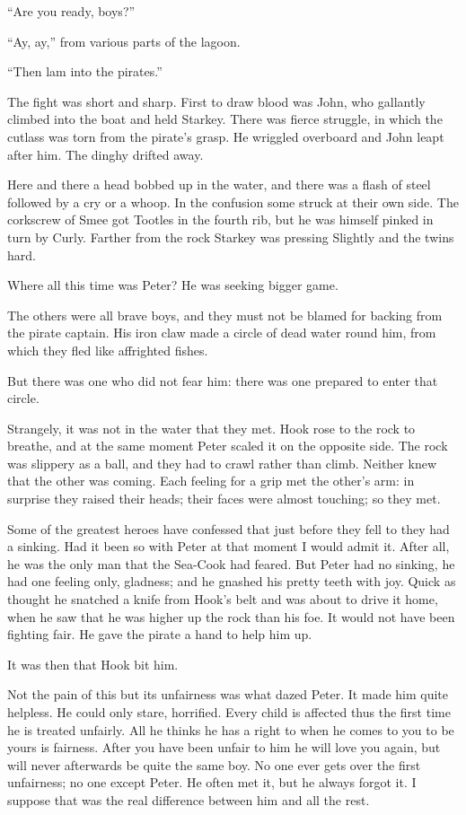 ``Are you ready, boys?''

``Ay, ay,'' from various parts of the lagoon.

``Then lam into the pirates.''

The fight was short and sharp. First to draw blood was John, who
gallantly climbed into the boat and held Starkey. There was fierce
struggle, in which the cutlass was torn from the pirate's grasp. He
wriggled overboard and John leapt after him. The dinghy drifted away.

Here and there a head bobbed up in the water, and there was a flash of
steel followed by a cry or a whoop. In the confusion some struck at
their own side. The corkscrew of Smee got Tootles in the fourth rib,
but he was himself pinked in turn by Curly. Farther from the rock
Starkey was pressing Slightly and the twins hard.

Where all this time was Peter? He was seeking bigger game.

The others were all brave boys, and they must not be blamed for backing
from the pirate captain. His iron claw made a circle of dead water
round him, from which they fled like affrighted fishes.

But there was one who did not fear him: there was one prepared to enter
that circle.

Strangely, it was not in the water that they met. Hook rose to the rock
to breathe, and at the same moment Peter scaled it on the opposite
side. The rock was slippery as a ball, and they had to crawl rather
than climb. Neither knew that the other was coming. Each feeling for a
grip met the other's arm: in surprise they raised their heads; their
faces were almost touching; so they met.

Some of the greatest heroes have confessed that just before they fell
to they had a sinking. Had it been so with Peter at that moment I would
admit it. After all, he was the only man that the Sea-Cook had feared.
But Peter had no sinking, he had one feeling only, gladness; and he
gnashed his pretty teeth with joy. Quick as thought he snatched a knife
from Hook's belt and was about to drive it home, when he saw that he
was higher up the rock than his foe. It would not have been fighting
fair. He gave the pirate a hand to help him up.

It was then that Hook bit him.

Not the pain of this but its unfairness was what dazed Peter. It made
him quite helpless. He could only stare, horrified. Every child is
affected thus the first time he is treated unfairly. All he thinks he
has a right to when he comes to you to be yours is fairness. After you
have been unfair to him he will love you again, but will never
afterwards be quite the same boy. No one ever gets over the first
unfairness; no one except Peter. He often met it, but he always forgot
it. I suppose that was the real difference between him and all the
rest.

